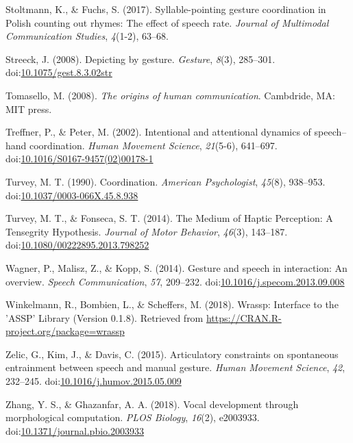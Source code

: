 \documentclass[
  man, noextraspace,floatsintext]{apa6}
\newlength{\cslhangindent}
\newenvironment{cslreferences}%
  {\setlength{\parindent}{0pt}%
  \everypar{\setlength{\hangindent}{\cslhangindent}}\ignorespaces}%
  {\par}
\begin{document}
\begin{cslreferences}
\leavevmode\hypertarget{ref-stoltmannSyllablepointingGestureCoordination2017}{}%
Stoltmann, K., \& Fuchs, S. (2017). Syllable-pointing gesture coordination in Polish counting out rhymes: The effect of speech rate. \emph{Journal of Multimodal Communication Studies}, \emph{4}(1-2), 63--68.

\leavevmode\hypertarget{ref-streeckDepictingGesture2008}{}%
Streeck, J. (2008). Depicting by gesture. \emph{Gesture}, \emph{8}(3), 285--301. doi:\href{https://doi.org/10.1075/gest.8.3.02str}{10.1075/gest.8.3.02str}

\leavevmode\hypertarget{ref-tomaselloOriginsHumanCommunication2008}{}%
Tomasello, M. (2008). \emph{The origins of human communication}. Cambdride, MA: MIT press.

\leavevmode\hypertarget{ref-treffnerIntentionalAttentionalDynamics2002}{}%
Treffner, P., \& Peter, M. (2002). Intentional and attentional dynamics of speech--hand coordination. \emph{Human Movement Science}, \emph{21}(5-6), 641--697. doi:\href{https://doi.org/10.1016/S0167-9457(02)00178-1}{10.1016/S0167-9457(02)00178-1}

\leavevmode\hypertarget{ref-turveyCoordination1990}{}%
Turvey, M. T. (1990). Coordination. \emph{American Psychologist}, \emph{45}(8), 938--953. doi:\href{https://doi.org/10.1037/0003-066X.45.8.938}{10.1037/0003-066X.45.8.938}

\leavevmode\hypertarget{ref-turveyMediumHapticPerception2014}{}%
Turvey, M. T., \& Fonseca, S. T. (2014). The Medium of Haptic Perception: A Tensegrity Hypothesis. \emph{Journal of Motor Behavior}, \emph{46}(3), 143--187. doi:\href{https://doi.org/10.1080/00222895.2013.798252}{10.1080/00222895.2013.798252}

\leavevmode\hypertarget{ref-wagnerGestureSpeechInteraction2014}{}%
Wagner, P., Malisz, Z., \& Kopp, S. (2014). Gesture and speech in interaction: An overview. \emph{Speech Communication}, \emph{57}, 209--232. doi:\href{https://doi.org/10.1016/j.specom.2013.09.008}{10.1016/j.specom.2013.09.008}

\leavevmode\hypertarget{ref-winkelmannWrasspInterfaceASSP2018}{}%
Winkelmann, R., Bombien, L., \& Scheffers, M. (2018). Wrassp: Interface to the 'ASSP' Library (Version 0.1.8). Retrieved from \url{https://CRAN.R-project.org/package=wrassp}

\leavevmode\hypertarget{ref-zelicArticulatoryConstraintsSpontaneous2015}{}%
Zelic, G., Kim, J., \& Davis, C. (2015). Articulatory constraints on spontaneous entrainment between speech and manual gesture. \emph{Human Movement Science}, \emph{42}, 232--245. doi:\href{https://doi.org/10.1016/j.humov.2015.05.009}{10.1016/j.humov.2015.05.009}

\leavevmode\hypertarget{ref-zhangVocalDevelopmentMorphological2018}{}%
Zhang, Y. S., \& Ghazanfar, A. A. (2018). Vocal development through morphological computation. \emph{PLOS Biology}, \emph{16}(2), e2003933. doi:\href{https://doi.org/10.1371/journal.pbio.2003933}{10.1371/journal.pbio.2003933}
\end{cslreferences}

\endgroup
\end{document}

